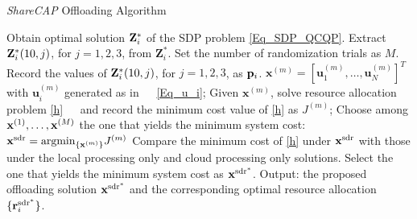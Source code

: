 \documentclass[10pt,journal,compsoc]{IEEEtran}
\def\pbf{{\bf p}}
\def\rbf{{\bf r}}
\def\xbf{{\bf x}}
\def\rbf{{\bf r}}
\def\xbf{{\bf x}}
\def\Zbf{{\bf Z}}
\begin{document}
{\begin{algorithm}[!t]
  \caption{\textit{ShareCAP} Offloading Algorithm}
  \begin{algorithmic}[1]
    \State Obtain optimal solution $\Zbf_i^*$ of the SDP problem \eqref{Eq_SDP_QCQP}.
 Extract $\Zbf^*_i(10,j)$, for $j=1,2,3$, from $\mathbf{Z}_i^*$. Set the number of
randomization trials as $M$. \State Record the values of
$\Zbf^*_i(10,j)$, for $j=1,2,3$, as $\pbf_i$.
      \State $\mathbf{x}^{(m)}=[\mathbf{u}_1^{(m)},\ldots, \mathbf{u}_N^{(m)}]^T$ with $\mathbf{u}_i^{(m)}$ generated as in
      \Statex $\ \ \ \ $ \eqref{Eq_u_i};
      \State Given $\mathbf{x}^{(m)}$, solve resource allocation problem \eqref{h}
      \Statex $\ \ \ \ $ and record the minimum cost value of \eqref{h} as $J^{(m)}$;
      \EndFor
    \State Choose among $\xbf^{(1)},\ldots,\xbf^{(M)}$ the one that yields the minimum system cost: $\xbf^{\mathrm{sdr}} = \mathrm{argmin}_{\{\mathbf{x}^{(m)}\}} J^{(m)}$
     \State Compare the minimum cost of \eqref{h} under $\xbf^{\mathrm{sdr}}$ with those under the local processing only and cloud processing only solutions. Select the one that yields the minimum system cost as  $\xbf^{\mathrm{sdr}^*}$.
    \State Output: the proposed offloading solution $\xbf^{\mathrm{sdr}^*}$ and the corresponding optimal resource allocation $\{\rbf_i^{\mathrm{sdr}^*}\}$.
  \end{algorithmic}
  \label{algorithm}
\end{algorithm}



}
\end{document}
